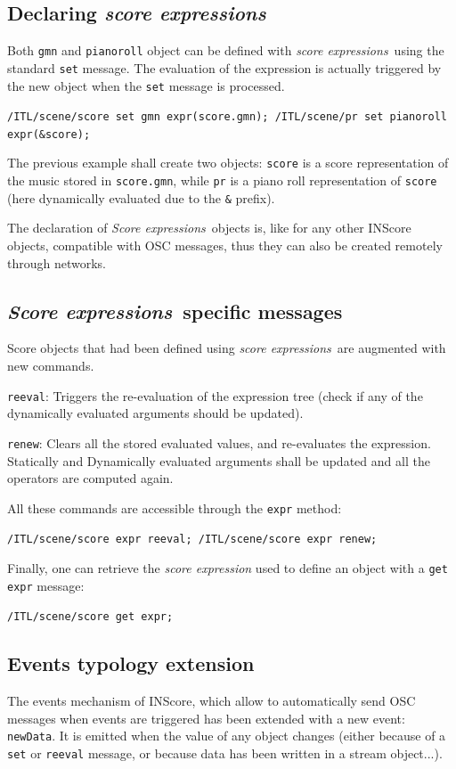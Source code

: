 \documentclass{article}
\newcommand{\OSC}[1]{\texttt{#1}}
\newcommand{\sExpr}{\emph{score expressions}}
\newcommand{\SExpr}{\emph{Score expressions}}
\let\olditemize\itemize
\let\oldenditemize\enditemize
\renewenvironment{itemize} 	{\olditemize \setlength{\itemsep}{1mm}}{\oldenditemize}
\newcommand{\sample}	[1]			{\vspace{-0.2em}\begin{center}\colorbox{mygrey}{\begin{minipage}[t]{0.95\columnwidth} {\small \texttt{#1}}\end{minipage}}\end{center}}
\begin{document}
\subsection{Declaring \sExpr}
\label{declaringExpr}
Both \OSC{gmn} and \OSC{pianoroll} object can be defined with \sExpr\ using the standard \OSC{set} message. The evaluation of the expression is actually triggered by the new object when the \OSC{set} message is processed.
\sample{/ITL/scene/score set gmn expr(score.gmn);
/ITL/scene/pr set pianoroll expr(\&score);
}

The previous example shall create two objects: \OSC{score} is a score representation of the music stored in \OSC{score.gmn}, while \OSC{pr} is a piano roll representation of \OSC{score} (here dynamically evaluated due to the \OSC{\&} prefix).

The declaration of \SExpr\ objects is, like for any other INScore objects, compatible with OSC messages, thus they can also be created remotely through networks. 

\subsection{\SExpr\ specific messages}
\label{exprMsgs}
Score objects that had been defined using \sExpr\ are augmented with new commands.

\begin{itemize}
\item \OSC{reeval}: Triggers the re-evaluation of the expression tree (check if any of the dynamically evaluated arguments should be updated).
\item \OSC{renew}: Clears all the stored evaluated values, and re-evaluates the expression. Statically and Dynamically evaluated arguments shall be updated and all the operators are computed again.
\end{itemize}

All these commands are accessible through the \OSC{expr} method:\sample{/ITL/scene/score expr reeval;
/ITL/scene/score expr renew;
}

Finally, one can retrieve the \emph{score expression} used to define an object with a \OSC{get expr} message:
\sample{/ITL/scene/score get expr;}

\subsection{Events typology extension}
\label{exprEvents}

The events mechanism of INScore, which allow to automatically send OSC messages when events are triggered \cite{Fober:13b} has  been extended with a new event: \OSC{newData}. It is emitted when the value of any object changes (either because of a \OSC{set} or \OSC{reeval} message, or because data has been written in a stream object...).
\end{document}
